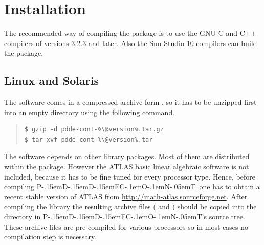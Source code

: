 \documentclass[10pt,a4paper]{ddedoc}
\def\pdde{{P\kern-.15emD\kern-.15emD\kern-.15emE\raisebox{.25ex}{-}C\kern-.1emO\kern-.1emN\kern-.05emT}}
\begin{document}
\section{Installation}

The recommended way of compiling the package is to use the GNU C and C++ compilers of versions 3.2.3 and later. Also the Sun Studio 10 compilers can build the package.

\subsection{Linux and Solaris}

The software comes in a compressed archive form , so it has to be unzipped first into an empty directory using the following command.
{ \small \begin{quote} \begin{lstlisting}[basicstyle=\ttfamily,frame=single]
$ gzip -d pdde-cont-%\@version%.tar.gz
$ tar xvf pdde-cont-%\@version%.tar
\end{lstlisting} \end{quote} } \noindent
The software depends on other library packages. Most of them are distributed within the package. However the ATLAS basic linear algebraic software is not included, because it has to be fine tuned for every processor type. Hence, before compiling \pdde\ one has to obtain a recent stable version of ATLAS from \url{http://math-atlas.sourceforge.net}. After compiling the library the resulting archive files ( and ) should be copied into the  directory in \pdde 's source tree. These archive files are pre-compiled for various processors so in most cases no compilation step is necessary.
\end{document}
